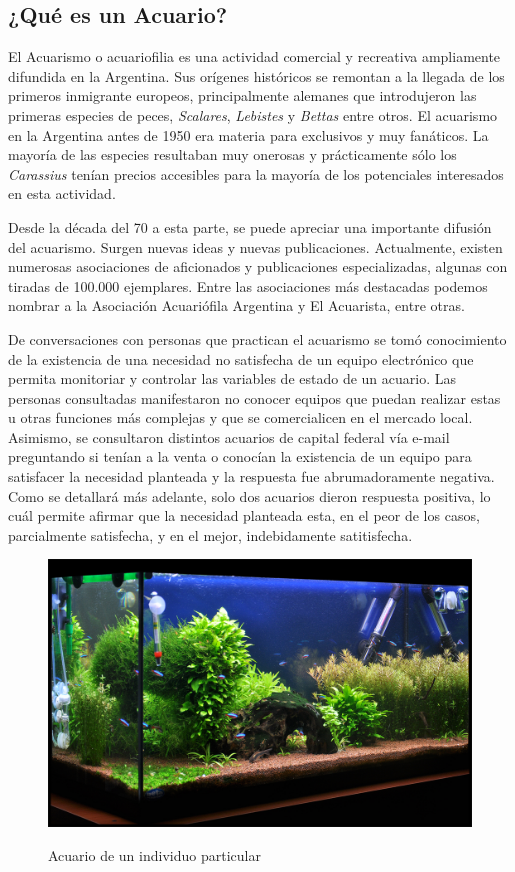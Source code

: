 \subsection{¿Qué es un Acuario?}
\label{acuario}

El Acuarismo o acuariofilia es una actividad comercial y recreativa ampliamente difundida en la Argentina.  Sus orígenes históricos se remontan a la llegada de los primeros inmigrante europeos, principalmente alemanes que introdujeron las primeras especies de peces, \textit{Scalares}, \textit{Lebistes} y \textit{Bettas} entre otros.
El acuarismo en la Argentina antes de 1950 era materia para exclusivos y muy fanáticos. La mayoría de las especies resultaban muy onerosas y prácticamente sólo los \textit{Carassius} tenían precios accesibles para la mayoría de los potenciales interesados en esta actividad.

Desde la década del 70 a esta parte, se puede apreciar una importante difusión del acuarismo. Surgen nuevas ideas y nuevas publicaciones.  Actualmente, existen numerosas asociaciones de aficionados y publicaciones especializadas, algunas con tiradas de 100.000 ejemplares.  Entre las asociaciones más destacadas podemos nombrar a la Asociación Acuariófila Argentina y El Acuarista, entre otras.

De conversaciones con personas que practican el acuarismo se tomó conocimiento de la existencia de una necesidad no satisfecha de un equipo electrónico que permita monitoriar y controlar las variables de estado de un acuario.  %
Las personas consultadas manifestaron no conocer equipos que puedan realizar estas u otras funciones más complejas y que se comercialicen en el mercado local.  
Asimismo, se consultaron distintos acuarios de capital federal vía e-mail preguntando si tenían a la venta o conocían la existencia de un equipo para satisfacer la necesidad planteada y la respuesta fue abrumadoramente negativa. Como se detallará más adelante, solo dos acuarios dieron respuesta positiva, lo cuál permite afirmar que la necesidad planteada esta, en el peor de los casos, parcialmente satisfecha, y en el mejor, indebidamente satitisfecha.

\begin{figure}[]
	\centering
    \includegraphics[width=.5\textwidth]{./Figures/acuarioHobby3.jpg}
	\label{fig.acuarioHobby}
	\caption{Acuario de un individuo particular}
\end{figure}       


